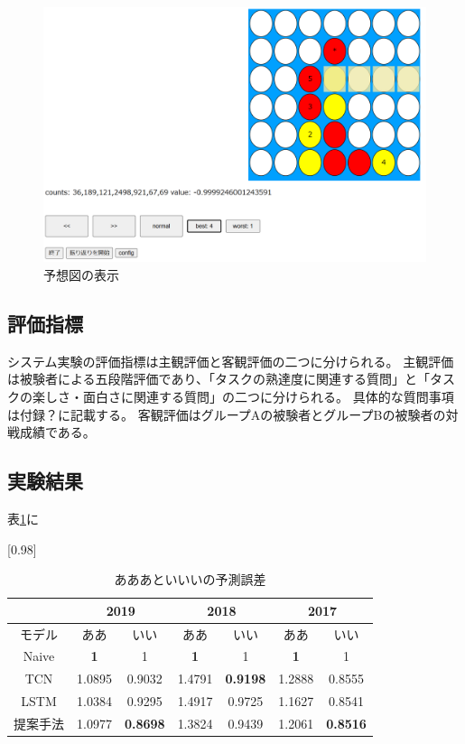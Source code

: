 \begin{figure}[t]
	\centering
	\includegraphics[width=\linewidth]{./figure/trajSystem.png}
	\caption{予想図の表示}
	\label{fig:trajSystem}
\end{figure}
\subsection{評価指標}
システム実験の評価指標は主観評価と客観評価の二つに分けられる。
主観評価は被験者による五段階評価であり、「タスクの熟達度に関連する質問」と「タスクの楽しさ・面白さに関連する質問」の二つに分けられる。
具体的な質問事項は付録？に記載する。
客観評価はグループAの被験者とグループBの被験者の対戦成績である。

\subsection{実験結果}
表\ref{table:result-1}に

\begin{table}[H]
	\caption{あああといいいの予測誤差}
	\centering
	\scalebox{0.98}[0.98]{
		\begin{tabular}{c|c|c|c|c|c|c}
			\multicolumn{1}{c}{} & \multicolumn{2}{|c|}{2019} 
			& \multicolumn{2}{c|}{2018} & \multicolumn{2}{c}{2017}\\ \hline \hline
			モデル    & ああ & いい & ああ & いい & ああ & いい \\ \hline
			Naive    & \bf{1} & 1 & \bf{1} & 1 & \bf{1} & 1 \\
			TCN      & 1.0895 & 0.9032 & 1.4791 & \bf{0.9198} & 1.2888 & 0.8555 \\
			LSTM     & 1.0384 & 0.9295 & 1.4917 & 0.9725 & 1.1627 & 0.8541 \\
			提案手法  & 1.0977 & \bf{0.8698} & 1.3824 & 0.9439 & 1.2061 & \bf{0.8516} \\
		\end{tabular}
	}
	\label{table:result-1}
\end{table}
